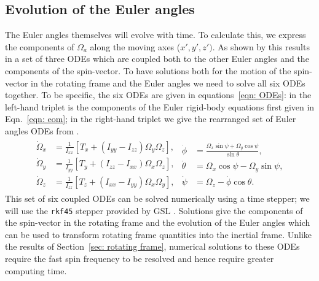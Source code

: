 \documentclass[../full_thesis/full_thesis.tex]{subfiles}
\begin{document}
\subsection{Evolution of the Euler angles}
\label{sec: evolution of the euler angles}
The Euler angles themselves will evolve with time. To calculate this, we express
the components of $\Omega_a$ along the moving axes ($x', y', z')$. As shown by
\citet{Landau1969} this results in a set of three ODEs which are coupled both to
the other Euler angles and the components of the spin-vector. To have solutions
both for the motion of the spin-vector in the rotating frame and the Euler
angles we need to solve all six ODEs together. To be specific, the six ODEs are
given in equations~\eqref{eqn: ODEs}: in the left-hand triplet is the
components of the Euler rigid-body equations first given in Eqn.~\eqref{eqn:
eom}; in the right-hand triplet we give the rearranged set of Euler angles ODEs
from \citet{Landau1969}.
\begin{align}
\begin{split}
\dot{\Omega}_{x} & = \frac{1}{I_{xx}}\left[T_{x} +
                      \left(I_{yy} - I_{zz}\right) \Omega_{y} \Omega_{z}\right],
\\
\dot{\Omega}_{y} & = \frac{1}{I_{yy}}\left[T_{y} +
                      \left(I_{zz} - I_{xx}\right) \Omega_{x} \Omega_{z}\right],
\\
\dot{\Omega}_{z} & =\frac{1}{I_{zz}}\left[T_{z} +
                      \left(I_{xx} - I_{yy}\right) \Omega_{x} \Omega_{y}\right],
\end{split}
\begin{split}
\dot{\phi} & = \frac{\Omega_{x} \sin \psi + \Omega_{y} \cos \psi}{\sin \theta},\\
\dot{\theta} & = \Omega_{x} \cos \psi - \Omega_{y} \sin \psi,\\
\dot{\psi} & = \Omega_{z} - \dot{\phi} \cos \theta.
\end{split}
\label{eqn: ODEs}
\end{align}
This set of six coupled ODEs can be solved numerically using a time stepper; we
will use the \texttt{rkf45} stepper provided by GSL \citep{gough2009gnu}.
Solutions give the components of the spin-vector in the rotating frame and the
evolution of the Euler angles which can be used to transform rotating frame
quantities into the inertial frame. Unlike the results of Section~\ref{sec:
rotating frame}, numerical solutions to these ODEs require the fast spin frequency
to be resolved and hence require greater computing time.
\end{document}
